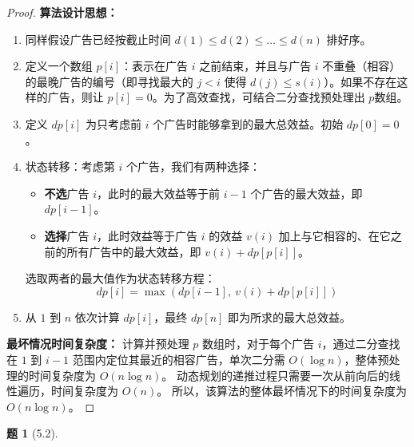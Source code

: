 \documentclass[11pt, a4paper]{article}
\newtheorem{problem}{题}
\begin{document}
\begin{proof}
    \textbf{算法设计思想：}
    \begin{enumerate}
        \item 同样假设广告已经按截止时间 $d(1) \le d(2) \le \dots \le d(n)$ 排好序。
        \item 定义一个数组 $p[i]$：表示在广告 $i$ 之前结束，并且与广告 $i$ 不重叠（相容）的最晚广告的编号（即寻找最大的 $j < i$ 使得 $d(j) \le s(i)$）。如果不存在这样的广告，则让 $p[i] = 0$。为了高效查找，可结合二分查找预处理出 $p数组$。
        \item 定义 $dp[i]$ 为只考虑前 $i$ 个广告时能够拿到的最大总效益。初始 $dp[0] = 0$。
        \item 状态转移：考虑第 $i$ 个广告，我们有两种选择：
        \begin{itemize}
            \item \textbf{不选}广告 $i$，此时的最大效益等于前 $i-1$ 个广告的最大效益，即 $dp[i-1]$。
            \item \textbf{选择}广告 $i$，此时效益等于广告 $i$ 的效益 $v(i)$ 加上与它相容的、在它之前的所有广告中的最大效益，即 $v(i) + dp[p[i]]$。
        \end{itemize}
        选取两者的最大值作为状态转移方程：
        $$dp[i] = \max(dp[i-1], \ v(i) + dp[p[i]])$$
        \item 从 $1$ 到 $n$ 依次计算 $dp[i]$，最终 $dp[n]$ 即为所求的最大总效益。
    \end{enumerate}

    \textbf{最坏情况时间复杂度：}
    计算并预处理 $p$ 数组时，对于每个广告 $i$，通过二分查找在 $1$ 到 $i-1$ 范围内定位其最近的相容广告，单次二分需 $O(\log n)$，整体预处理的时间复杂度为 $O(n \log n)$。
    动态规划的递推过程只需要一次从前向后的线性遍历，时间复杂度为 $O(n)$。
    所以，该算法的整体最坏情况下的时间复杂度为 $O(n \log n)$。
\end{proof}

\begin{problem}[5.2]
\end{problem}
\end{document}
